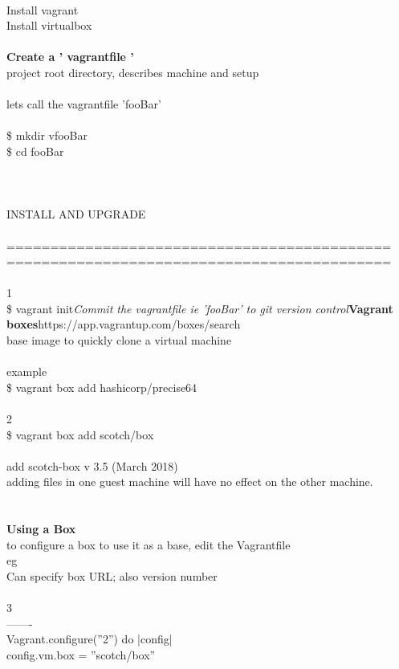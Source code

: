 \documentclass[10pt,a4paper]{article}
\begin{document}
{{{{{{{{{{{{{{{{{{{{{{{{\\
Install vagrant\\
Install virtualbox\\
\\
\textbf{Create a ' vagrantfile '}  \\
project root directory, describes machine and setup\\
\\
lets call the vagrantfile 'fooBar'\\
\\
\$ mkdir vfooBar\\
\$ cd fooBar\\
\\
\\
\\
{\Large INSTALL AND UPGRADE\\
}\\
============================================\\
============================================\\
\\
1\\
\$ vagrant init\textit{Commit the vagrantfile ie 'fooBar' to git version control}\textbf{Vagrant boxes}https://app.vagrantup.com/boxes/search\\
base image to quickly clone a virtual machine\\
\\
example\\
\$ vagrant box add hashicorp/precise64\\
\\
2\\
\$ vagrant box add scotch/box\\
\\
add scotch-box v 3.5 (March 2018)\\
adding files in one guest machine will have no effect on the other machine.\\
\\
\\
\textbf{Using a Box}\\
to configure a box to use it as a base, edit the Vagrantfile \\
eg\\
Can specify box URL; also version number\\
\\
3\\
-------\\
Vagrant.configure(''2'') do |config|\\
  config.vm.box = ''scotch/box''\\
}}}}}}}}}}}}}}}}}}}}}}}}
\end{document}

